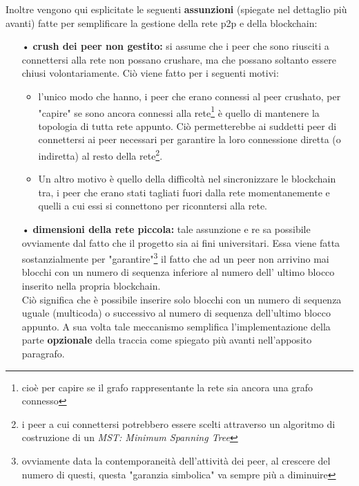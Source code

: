 Inoltre vengono qui esplicitate le seguenti \textbf{assunzioni} (spiegate nel dettaglio più avanti) fatte per semplificare la gestione della rete p2p e della blockchain:
\begin{itemize}
\item[•]\textbf{crush dei peer non gestito:} si assume che i peer che sono riusciti a connettersi alla rete non possano crushare, ma che possano soltanto essere chiusi volontariamente. Ciò viene fatto per i seguenti motivi:
\begin{itemize}
\item l'unico modo che hanno,  i peer che erano connessi al peer crushato, per "capire" se sono ancora connessi alla rete\footnote{cioè per capire se il grafo rappresentante la rete sia ancora una grafo connesso} è quello di mantenere la topologia di tutta rete appunto. Ciò permetterebbe ai suddetti peer di connettersi ai peer necessari per garantire la loro connessione diretta (o indiretta) al resto della rete\footnote{i peer a cui connettersi potrebbero essere scelti attraverso un algoritmo di costruzione di un \textit{MST: Minimum Spanning Tree}}.
\item Un altro motivo è quello della difficoltà nel sincronizzare le blockchain tra, i peer che erano stati tagliati fuori dalla rete momentanemente e quelli a cui essi si connettono per riconntersi alla rete.
\end{itemize}
\item[•]\textbf{dimensioni della rete piccola:} tale assunzione e re sa possibile ovviamente dal fatto che il progetto sia ai fini universitari. Essa viene fatta sostanzialmente per "garantire"\footnote{ovviamente data la contemporaneità  dell'attività dei peer, al crescere del numero di questi, questa "garanzia simbolica" va sempre più a diminuire} il fatto che ad un peer non arrivino mai blocchi con un numero di sequenza inferiore al numero dell' ultimo  blocco inserito nella propria blockchain.\\ Ciò significa che è possibile inserire solo blocchi con un numero di sequenza uguale (multicoda) o successivo al numero di sequenza dell'ultimo blocco appunto. A sua volta tale meccanismo semplifica l'implementazione della parte \textbf{opzionale} della traccia come spiegato più avanti nell'apposito paragrafo.
\end{itemize}

